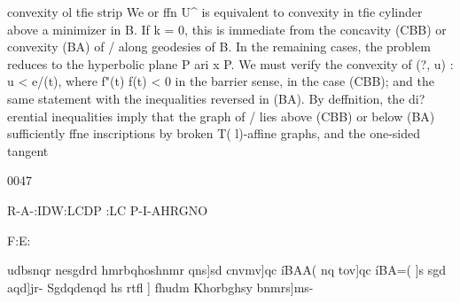 convexity ol tfie strip We or ffn U^ is equivalent to convexity in tfie
cylinder above a minimizer in B. If k = 0, this is immediate from the
concavity (CBB) or convexity (BA) of / along geodesies of B. In the
remaining cases, the problem reduces to the hyperbolic plane P ari x P.
We must verify the convexity of {(?, u) : u < e/(t)}, where f"(t) f(t) < 0
in the barrier sense, in the case (CBB); and the same statement with the
inequalities reversed in (BA). By deffnition, the di?erential inequalities
imply that the graph of / lies above (CBB) or below (BA) sufficiently
ffne inscriptions by broken T(   l)-affine graphs, and the one-sided tangent

0047

R-A-:IDW:LCDP :LC P-I-AHRGNO

F:E:

udbsnqr nesgdrd hmrbqhoshnmr qns]sd cnvmv]qc íBAA( nq tov]qc íBA=( ]s
sgd aqd]jr- Sgdqdenqd hs rtfl
] fhudm Khorbghsy bnmrs]ms-

